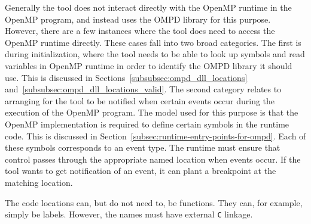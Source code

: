 Generally the tool does not interact directly with the OpenMP
runtime in the OpenMP program, and instead uses the OMPD library
for this purpose.
However, there are a few instances where the tool does need
to access the OpenMP runtime directly.
These cases fall into two broad categories.
The first is during initialization, where the tool needs
to be able to look up symbols and read variables in OpenMP runtime
in order to identify the OMPD library it should use.
This is discussed in Sections~\ref{subsubsec:ompd_dll_locations}
and~\ref{subsubsec:ompd_dll_locations_valid}.
The second category relates to arranging for the tool to be notified
when certain events occur during the execution of the OpenMP program.
The model used for this purpose is that the OpenMP implementation
is required to define certain symbols in the runtime code.
This is discussed in Section~\ref{subsec:runtime-entry-points-for-ompd}.
Each of these symbols corresponds to an event type.
The runtime must ensure that control passes through the appropriate
named location when events occur.
If the tool wants to get notification of an event, it can plant
a breakpoint at the matching location.

The code locations can, but do not need to, be functions.
They can, for example, simply be labels.
However, the names must have external \texttt{C} linkage.


